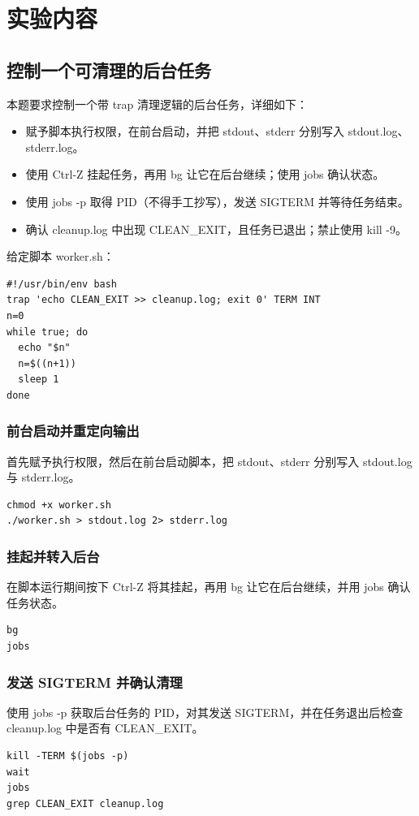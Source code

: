 \section{实验内容}

\subsection{控制一个可清理的后台任务}
本题要求控制一个带 trap 清理逻辑的后台任务，详细如下：
\begin{itemize}
    \item 赋予脚本执行权限，在前台启动，并把 stdout、stderr 分别写入 stdout.log、stderr.log。
    \item 使用 Ctrl-Z 挂起任务，再用 bg 让它在后台继续；使用 jobs 确认状态。
    \item 使用 jobs -p 取得 PID（不得手工抄写），发送 SIGTERM 并等待任务结束。
    \item 确认 cleanup.log 中出现 CLEAN\_EXIT，且任务已退出；禁止使用 kill -9。
\end{itemize}

给定脚本 worker.sh：
\begin{verbatim}
#!/usr/bin/env bash
trap 'echo CLEAN_EXIT >> cleanup.log; exit 0' TERM INT
n=0
while true; do
  echo "$n"
  n=$((n+1))
  sleep 1
done
\end{verbatim}

\subsubsection*{前台启动并重定向输出}
首先赋予执行权限，然后在前台启动脚本，把 stdout、stderr 分别写入 stdout.log 与 stderr.log。
\begin{verbatim}
chmod +x worker.sh
./worker.sh > stdout.log 2> stderr.log
\end{verbatim}

\subsubsection*{挂起并转入后台}
在脚本运行期间按下 Ctrl-Z 将其挂起，再用 bg 让它在后台继续，并用 jobs 确认任务状态。
\begin{verbatim}
bg
jobs
\end{verbatim}

\subsubsection*{发送 SIGTERM 并确认清理}
使用 jobs -p 获取后台任务的 PID，对其发送 SIGTERM，并在任务退出后检查 cleanup.log 中是否有 CLEAN\_EXIT。
\begin{verbatim}
kill -TERM $(jobs -p)
wait
jobs
grep CLEAN_EXIT cleanup.log
\end{verbatim}

